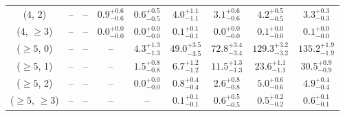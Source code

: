 \begin{table}[h!]
{\begin{tabular}{ccccccccc}
	(4, 2) & -- & -- & $0.9^{+ 0.6 }_{- 0.6 }$ & $0.6^{+ 0.5 }_{- 0.5 }$ & $4.0^{+ 1.1 }_{- 1.1 }$ & $3.1^{+ 0.6 }_{- 0.6 }$ & $4.2^{+ 0.5 }_{- 0.5 }$ & $3.3^{+ 0.3 }_{- 0.3 }$ \\[0.5ex] 
	(4, $\ge3$) & -- & -- & $0.0^{+ 0.0 }_{- 0.0 }$ & $0.0^{+ 0.0 }_{- 0.0 }$ & $0.1^{+ 0.1 }_{- 0.1 }$ & $0.0^{+ 0.0 }_{- 0.0 }$ & $0.1^{+ 0.0 }_{- 0.0 }$ & $0.1^{+ 0.0 }_{- 0.0 }$ \\[0.5ex] 
	($\ge5$, 0) & -- & -- & -- & $4.3^{+ 1.3 }_{- 1.3 }$ & $49.0^{+ 3.5 }_{- 3.5 }$ & $72.8^{+ 3.4 }_{- 3.4 }$ & $129.3^{+ 3.2 }_{- 3.2 }$ & $135.2^{+ 1.9 }_{- 1.9 }$ \\[0.5ex] 
	($\ge5$, 1) & -- & -- & -- & $1.5^{+ 0.8 }_{- 0.8 }$ & $6.7^{+ 1.2 }_{- 1.2 }$ & $11.5^{+ 1.3 }_{- 1.3 }$ & $23.6^{+ 1.1 }_{- 1.1 }$ & $30.5^{+ 0.9 }_{- 0.9 }$ \\[0.5ex] 
	($\ge5$, 2) & -- & -- & -- & $0.0^{+ 0.0 }_{- 0.0 }$ & $0.8^{+ 0.4 }_{- 0.4 }$ & $2.6^{+ 0.8 }_{- 0.8 }$ & $5.0^{+ 0.6 }_{- 0.6 }$ & $4.9^{+ 0.4 }_{- 0.4 }$ \\[0.5ex] 
	($\ge5$, $\ge3$) & -- & -- & -- & -- & $0.1^{+ 0.1 }_{- 0.1 }$ & $0.6^{+ 0.5 }_{- 0.5 }$ & $0.5^{+ 0.2 }_{- 0.2 }$ & $0.6^{+ 0.1 }_{- 0.1 }$ \\[0.5ex] 
	\hline
	\hline
\end{tabular}}
\end{table}
